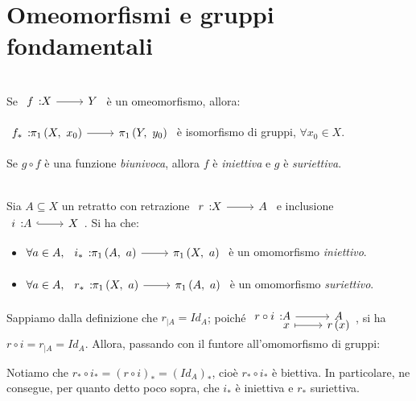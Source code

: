 \section{Omeomorfismi e gruppi fondamentali}
\begin{corollary}~{}\\
	Se $\funz{f}{X}{Y}$ è un omeomorfismo, allora:
	\begin{center}
		$\funz{f_{\ast}}{\gruf{X}{x_0}}{\gruf{Y}{y_0}}$ è isomorfismo di gruppi, $\forall x_0\in X$.
	\end{center}
\vspace{-3mm}
\end{corollary}
\begin{remember}
	Se $g\circ f$ è una funzione \textit{biunivoca}, allora $f$ è \textit{iniettiva} e $g$ è \textit{suriettiva}.
\end{remember}
\begin{corollary}~{}\label{grp fond iniettiva e suriettiva}\\
Sia $A\subseteq X$ un retratto con retrazione $\funz{r}{X}{A}$ e inclusione $\incl{i}{A}{X}$. Si ha che:
	\begin{itemize}
		\item $\forall a\in A,\ \funz{i_{\ast}}{\gruf{A}{a}}{\gruf{X}{a}}$ è un omomorfismo \textit{iniettivo}.
		\item $\forall a\in A,\ \funz{r_{\ast}}{\gruf{X}{a}}{\gruf{A}{a}}$ è un omomorfismo \textit{suriettivo}.
	\end{itemize}
\end{corollary}
\begin{demonstration}
	Sappiamo dalla definizione che $r_{\mid A}=Id_A$; poiché $\funztot{r\circ i}{A}{A}{x}{r\left(x\right)}$, si ha $r\circ i=r_{\mid A}=Id_A$. Allora, passando con il funtore all'omomorfismo di gruppi:
	\begin{center}
	\end{center}
Notiamo che $r_{\ast}\circ i_{\ast}=\left(r\circ i\right)_{\ast}=\left(Id_A\right)_{\ast}$, cioè $r_{\ast}\circ i_{\ast}$ è biettiva. In particolare, ne consegue, per quanto detto poco sopra, che $i_{\ast}$ è iniettiva e $r_{\ast}$ suriettiva.
\end{demonstration}
